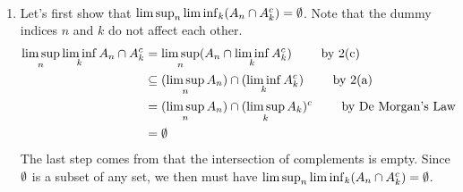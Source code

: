 \documentclass[12pt]{article}
\begin{document}
\begin{problem}[3]
~\begin{enumerate}[label=\alph*)]
	\item Let's first show that $ \limsup_{  n} \liminf_{  k} (A_n \cap A_k^{c}) = \emptyset$. Note that the dummy indices $ n$ and  $ k$ do not affect each other.
	\begin{align*}
		\limsup_{  n} \liminf_{ k} A_n \cap A_k^{c} &= \limsup_{  n} (A_n \cap \liminf_{ k} A_k^{c}) \qquad \text{ by 2(c)}  \\
							    & \subseteq (\limsup_{  n} A_n) \cap (\liminf_{ k} A_k^{c}) \qquad \text{ by 2(a)}   \\
							    &= ( \limsup_{  n} A_n) \cap (\limsup_{ k} A_k)^{c}\qquad \text{ by De Morgan's Law}   \\
							    &= \emptyset
	\end{align*}
	The last step comes from that the intersection of complements is empty. Since $ \emptyset$ is a subset of any set, we then must have $ \limsup_{  n} \liminf_{  k} (A_n \cap A_k^{c}) = \emptyset$.


\end{enumerate}
\end{problem}
\end{document}
